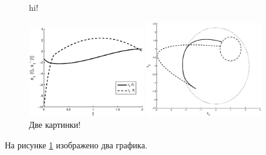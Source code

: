\documentclass[a4paper,12pt]{article}
\begin{document}
\begin{figure}[T]
 \centering %
\caption{hi!}

\end{figure}

\begin{figure}
 \centering %
 \includegraphics[keepaspectratio, width=0.45\textwidth]{pic_01}


 \includegraphics[keepaspectratio, width=0.45\textwidth]{pic_02}
\caption{Две картинки!}\label{dataPic}
\end{figure}

На рисунке \ref{dataPic} изображено два графика.
\end{document}
